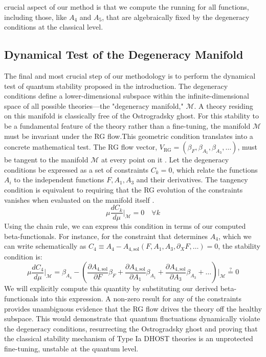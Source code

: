 \documentclass[twocolumn]{aastex631}
\begin{document}
crucial aspect of our method is that we compute the running for all functions, including those, like $A_4$ and $A_5$, that are algebraically fixed by the degeneracy conditions at the classical level.\subsection{Dynamical Test of the Degeneracy Manifold}The final and most crucial step of our methodology is to perform the dynamical test of quantum stability proposed in the introduction. The degeneracy conditions define a lower-dimensional subspace within the infinite-dimensional space of all possible theories---the "degeneracy manifold," $\mathcal{M}$. A theory residing on this manifold is classically free of the Ostrogradsky ghost. For this stability to be a fundamental feature of the theory rather than a fine-tuning, the manifold $\mathcal{M}$ must be invariant under the RG flow.This geometric condition translates into a concrete mathematical test. The RG flow vector, $V_{\text{RG}} = (\beta_F, \beta_{A_1}, \beta_{A_3}, \dots)$, must be tangent to the manifold $\mathcal{M}$ at every point on it \citep{bakas2007renormalizationgroupequationsgeometric,jackson2013geometricrgflow}. Let the degeneracy conditions be expressed as a set of constraints $C_k = 0$, which relate the functions $A_i$ to the independent functions $F, A_1, A_3$ and their derivatives. The tangency condition is equivalent to requiring that the RG evolution of the constraints vanishes when evaluated on the manifold itself \citep{jackson2013geometricrgflow}.\begin{equation}\mu \frac{dC_k}{d\mu} \bigg|_{\mathcal{M}} = 0 \quad \forall k\end{equation}Using the chain rule, we can express this condition in terms of our computed beta-functionals. For instance, for the constraint that determines $A_4$, which we can write schematically as $C_4 \equiv A_4 - A_{4,\text{sol}}(F, A_1, A_3, \partial_X F, \dots) = 0$, the stability condition is:\begin{equation}\mu \frac{dC_4}{d\mu} \bigg|_{\mathcal{M}} = \beta_{A_4} - \left( \frac{\partial A_{4,\text{sol}}}{\partial F}\beta_F + \frac{\partial A_{4,\text{sol}}}{\partial A_1}\beta_{A_1} + \frac{\partial A_{4,\text{sol}}}{\partial A_3}\beta_{A_3} + \dots \right) \bigg|_{\mathcal{M}} \stackrel{?}{=} 0\end{equation}We will explicitly compute this quantity by substituting our derived beta-functionals into this expression. A non-zero result for any of the constraints provides unambiguous evidence that the RG flow drives the theory off the healthy subspace. This would demonstrate that quantum fluctuations dynamically violate the degeneracy conditions, resurrecting the Ostrogradsky ghost and proving that the classical stability mechanism of Type Ia DHOST theories is an unprotected fine-tuning, unstable at the quantum level.
\end{document}

